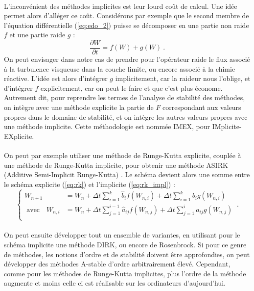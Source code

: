     \paragraph{}
    L’inconvénient des méthodes implicites est leur lourd coût de calcul.
    Une idée permet alors d'alléger ce coût.
    Considérons par exemple que le second membre de l'équation différentielle (\ref{eq:edo_2}) puisse se décomposer en une partie non raide $f$ et une partie raide $g$ :
    \[\frac{\partial W}{\partial t} = f\left(W\right) + g\left(W\right)\ .\]
    On peut envisager dans notre cas de prendre pour l'opérateur raide le flux associé à la turbulence visqueuse dans la couche limite, ou encore associé à la chimie réactive.
    L'idée est alors d'intégrer $g$ implicitement, car la raideur nous l'oblige, et d'intégrer $f$ explicitement, car on peut le faire et que c'est plus économe.
    Autrement dit, pour reprendre les termes de l'analyse de stabilité des méthodes, on intègre avec une méthode explicite la partie de $F$ correspondant aux valeurs propres dans le domaine de stabilité, et on intègre les autres valeurs propres avec une méthode implicite.
    Cette méthodologie est nommée IMEX, pour IMplicite-EXplicite.

    \paragraph{}
    On peut par exemple utiliser une méthode de Runge-Kutta explicite, couplée à une méthode de Runge-Kutta implicite, pour obtenir une méthode ASIRK (Additive Semi-Implicit Runge-Kutta) \cite{Zhong1996}.
    Le schéma devient alors une somme entre le schéma explicite (\ref{eq:rk}) et l'implicite (\ref{eq:rk_impl}) :
    \[\left\{\begin{aligned}
      W_{n+1} &= W_n + \Delta t\sum_{i = 1}^k\hat{b}_if\left(W_{n,i}\right) + \Delta t\sum_{i = 1}^kb_ig\left(W_{n,i}\right)\\
      \;\textrm{avec}\quad W_{n,i} &= W_n + \Delta t\sum_{j = 1}^{i-1}\hat{a}_{ij}f\left(W_{n,j}\right) + \Delta t\sum_{j = 1}^{i}a_{ij}g\left(W_{n,j}\right) \\
    \end{aligned}\right.\ .\]

    \paragraph{}
    On peut ensuite développer tout un ensemble de variantes, en utilisant pour le schéma implicite une méthode DIRK, ou encore de Rosenbrock.
    Si pour ce genre de méthodes, les notions d'ordre et de stabilité doivent être approfondies, on peut développer des méthodes A-stable d'ordre arbitrairement élevé.
    Cependant, comme pour les méthodes de Runge-Kutta implicites, plus l'ordre de la méthode augmente et moins celle ci est réalisable sur les ordinateurs d'aujourd'hui.

